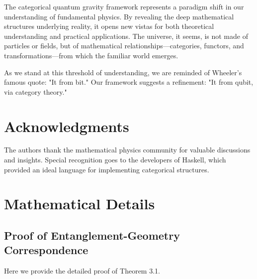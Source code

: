 \documentclass[12pt,a4paper]{article}
\theoremstyle{plain}
\theoremstyle{definition}
\theoremstyle{remark}
\begin{document}
The categorical quantum gravity framework represents a paradigm shift in our understanding of fundamental physics. By revealing the deep mathematical structures underlying reality, it opens new vistas for both theoretical understanding and practical applications. The universe, it seems, is not made of particles or fields, but of mathematical relationships—categories, functors, and transformations—from which the familiar world emerges.

As we stand at this threshold of understanding, we are reminded of Wheeler's famous quote: "It from bit." Our framework suggests a refinement: "It from qubit, via category theory."

\section*{Acknowledgments}

The authors thank the mathematical physics community for valuable discussions and insights. Special recognition goes to the developers of Haskell, which provided an ideal language for implementing categorical structures.




\appendix

\section{Mathematical Details}

\subsection{Proof of Entanglement-Geometry Correspondence}

Here we provide the detailed proof of Theorem 3.1.
\end{document}
